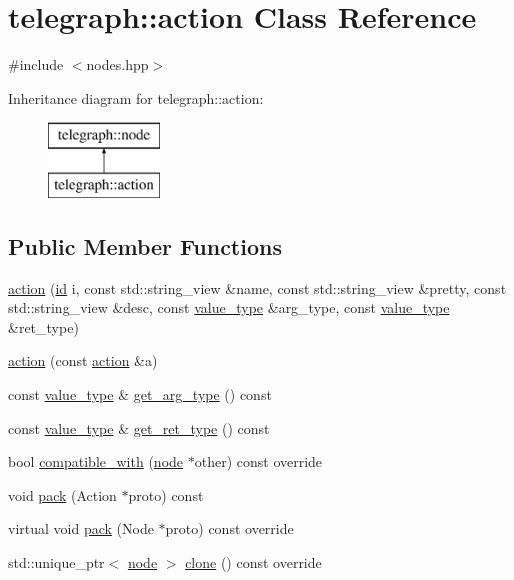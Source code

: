 \hypertarget{classtelegraph_1_1action}{}\section{telegraph\+:\+:action Class Reference}
\label{classtelegraph_1_1action}


{\ttfamily \#include $<$nodes.\+hpp$>$}

Inheritance diagram for telegraph\+:\+:action\+:\begin{figure}[H]
\begin{center}
\leavevmode
\includegraphics[height=2.000000cm]{classtelegraph_1_1action}
\end{center}
\end{figure}
\subsection*{Public Member Functions}
\begin{DoxyCompactItemize}
\item 
\hyperlink{classtelegraph_1_1action_a431cab501aaa724fc99b174804bc0024}{action} (\hyperlink{classtelegraph_1_1node_a90bc576d668ed141d5354a06aa9c8d9a}{id} i, const std\+::string\+\_\+view \&name, const std\+::string\+\_\+view \&pretty, const std\+::string\+\_\+view \&desc, const \hyperlink{classtelegraph_1_1value__type}{value\+\_\+type} \&arg\+\_\+type, const \hyperlink{classtelegraph_1_1value__type}{value\+\_\+type} \&ret\+\_\+type)
\item 
\hyperlink{classtelegraph_1_1action_a691a43a3b20d6a210dffc0f2228b8114}{action} (const \hyperlink{classtelegraph_1_1action}{action} \&a)
\item 
const \hyperlink{classtelegraph_1_1value__type}{value\+\_\+type} \& \hyperlink{classtelegraph_1_1action_a5d2e7bef5432f1246912f07296dfb4f1}{get\+\_\+arg\+\_\+type} () const
\item 
const \hyperlink{classtelegraph_1_1value__type}{value\+\_\+type} \& \hyperlink{classtelegraph_1_1action_a3d587001f7779581717b26b91564a5d8}{get\+\_\+ret\+\_\+type} () const
\item 
bool \hyperlink{classtelegraph_1_1action_a372bd4f9c1b7b4698e151448d5c28af9}{compatible\+\_\+with} (\hyperlink{classtelegraph_1_1node}{node} $\ast$other) const override
\item 
void \hyperlink{classtelegraph_1_1action_ab8b73ef00465e76e016c7f44923d4036}{pack} (Action $\ast$proto) const
\item 
virtual void \hyperlink{classtelegraph_1_1action_a849370efc692c6c4e7047e3b9c50983c}{pack} (Node $\ast$proto) const override
\item 
std\+::unique\+\_\+ptr$<$ \hyperlink{classtelegraph_1_1node}{node} $>$ \hyperlink{classtelegraph_1_1action_aa72bffae4f241be8a4366e3c7344a17b}{clone} () const override
\end{DoxyCompactItemize}
